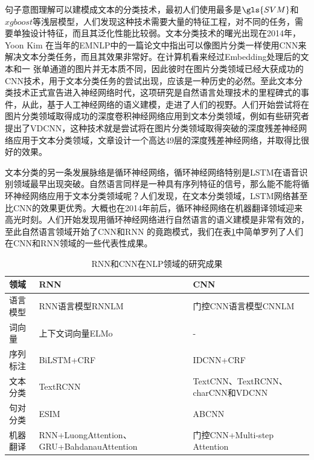 \documentclass[twoside,a4paper,12pt]{book}%
\begin{document}
句子意图理解可以建模成文本的分类技术，最初人们使用最多是$\gls{SVM}$和$xgboost$等浅层模型，人们发现这种技术需要大量的特征工程，对不同的任务，需要单独设计特征，而且其泛化性能比较弱。文本分类技术的曙光出现在2014年，Yoon Kim 在当年的EMNLP中的一篇论文中指出可以像图片分类一样使用\gls{CNN}来解决文本分类任务，而且其效果非常好。在计算机看来经过Embedding处理后的文本和一
张单通道的图片并无本质不同，因此彼时在图片分类领域已经大获成功的\gls{CNN}技术，用于文本分类任务的尝试出现，应该是一种历史的必然。至此文本分类技术正式宣告进入神经网络时代，这项研究是自然语言处理技术的里程碑式的事件，从此，基于人工神经网络的语义建模，走进了人们的视野。人们开始尝试将在图片分类领域取得成功的深度卷积神经网络应用到文本分类领域，例如有些研究者提出了\gls{VDCNN}，这种技术就是尝试将在图片分类领域取得突破的深度残差神经网络应用于文本分类领域，文章设计一个高达49层的深度残差神经网络，并取得比很好的效果。

文本分类的另一条发展脉络是循环神经网络，循环神经网络特别是\gls{LSTM}在语音识别领域最早出现突破。自然语言同样是一种具有序列特征的信号，那么能不能将循环神经网络应用于文本分类领域呢？人们发现，在文本分类领域，\gls{LSTM}网络甚至比\gls{CNN}的效果更优秀。大概也在2014年前后，循环神经网络在机器翻译领域迎来高光时刻。人们开始发现用循环神经网络进行自然语言的语义建模是非常有效的，至此自然语言领域开始了\gls{CNN}和\gls{RNN} 的竟跑模式，我们在表\ref{tab:rnncnnhistory}中简单罗列了人们在\gls{CNN}和\gls{RNN}领域的一些代表性成果。
\begin{table} [h]
	    \begin{center}
    \begin{tabular}{p{50pt}p{150pt}p{160pt}}  %
        \hline    
        领域&\gls{RNN}&\gls{CNN}\\
        \hline    
        语言模型& \gls{RNN}语言模型\gls{RNNLM} & 门控\gls{CNN}语言模型\gls{CNNLM} \\
        \hline   
        词向量 & 上下文词向量ELMo & - \\
        \hline
        序列标注 & BiLSTM+\gls{CRF} & \gls{IDCNN}+\gls{CRF} \\
        \hline
        文本分类 &TextRCNN & TextCNN、TextRCNN、charCNN和\gls{VDCNN} \\
        \hline
        句对分类& ESIM & ABCNN \\
        \hline
        机器翻译 & \gls{RNN}+LuongAttention、\gls{GRU}+BahdanauAttention & 门控CNN+Multi-step Attention \\
        \hline
    \end{tabular}
    \caption{RNN和CNN在NLP领域的研究成果}  \label{tab:rnncnnhistory}
    \end{center}
\end{table}  
\end{document}
